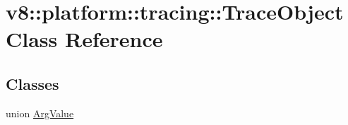 \hypertarget{classv8_1_1platform_1_1tracing_1_1TraceObject}{}\section{v8\+:\+:platform\+:\+:tracing\+:\+:Trace\+Object Class Reference}
\label{classv8_1_1platform_1_1tracing_1_1TraceObject}
\subsection*{Classes}
\begin{DoxyCompactItemize}
\item 
union \mbox{\hyperlink{unionv8_1_1platform_1_1tracing_1_1TraceObject_1_1ArgValue}{Arg\+Value}}
\end{DoxyCompactItemize}
